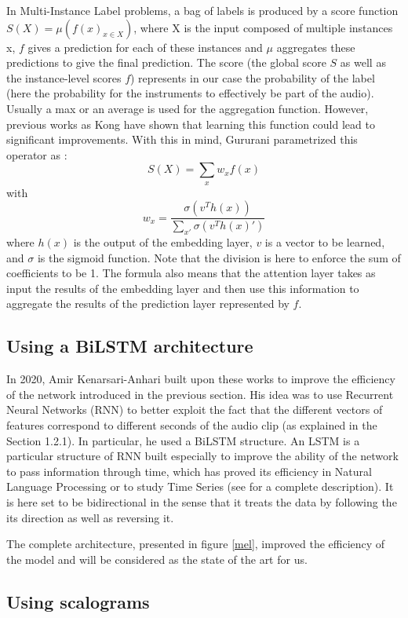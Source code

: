 \documentclass[final]{cvpr}
\begin{document}
In Multi-Instance Label problems, a bag of labels is produced by a score function $S(X)=\mu(f(x)_{x\in X})$, where X is the input composed of multiple instances x, $f$ gives a prediction for each of these instances and $\mu$ aggregates these predictions to give the final prediction. The score (the global score $S$ as well as the instance-level scores $f$) represents in our case the probability of the label (here the probability for the instruments to effectively be part of the audio). Usually a max or an average is used for the aggregation function. However, previous works as Kong \etal \cite{kong} have shown that learning this function could lead to significant improvements. With this in mind, Gururani \etal parametrized this operator as :
\[S(X)=\sum_{x}w_xf(x)\]
with 
\[w_x =\frac{\sigma(v^{T}h(x))}{\sum_{x'}\sigma(v^{T}h(x)')}\]
where $h(x)$ is the output of the embedding layer, $v$ is a vector to be learned, and $\sigma$ is the sigmoid function. Note that the division is here to enforce the sum of coefficients to be 1. The formula also means that the attention layer takes as input the results of the embedding layer and then use this information to aggregate the results of the prediction layer represented by $f$.
\subsection{Using a BiLSTM architecture}
In 2020, Amir Kenarsari-Anhari \cite{squelette_progr} built upon these works to improve the efficiency of the network introduced in the previous section. His idea was to use Recurrent Neural Networks (RNN) to better exploit the fact that the different vectors of features correspond to different seconds of the audio clip (as explained in the Section 1.2.1). In particular, he used a BiLSTM structure. An LSTM is a particular structure of RNN built especially to improve the ability of the network to pass information through time, which has proved its efficiency in Natural Language Processing or to study Time Series (see \cite{lstm} for a complete description). It is here set to be bidirectional in the sense that it treats the data by following the its direction as well as reversing it.

The complete architecture, presented in figure \ref{mel}, improved the efficiency of the model and will be considered as the state of the art for us. 
\subsection{Using scalograms}
\end{document}

